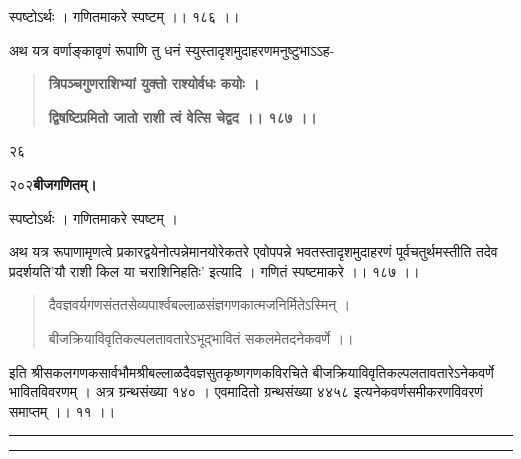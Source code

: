 \documentclass[11pt, openany]{book}
\begin{document}
\begin{sloppypar}
\hangindent=0.2in \hspace{0.2in}स्पष्टोऽर्थः । गणितमाकरे स्पष्टम् ।। १८६ ।। 

\hangindent=0.2in \hspace{0.2in}अथ यत्र वर्णाङ्कावृणं रूपाणि तु धनं स्युस्तादृशमुदाहरणमनुष्टुभाऽऽह- 

\begin{quote}
\hspace{0.5in}\textbf{त्रिपञ्चगुणराशिभ्यां युक्तो राश्योर्वधः कयोः ।}

\hspace{0.5in}\textbf{द्विषष्टिप्रमितो जातो राशी त्वं वेत्सि चेद्वद ।। १८७ ।।}
\end{quote}

 २६
\end{sloppypar}
\thispagestyle{empty}
\newpage

\onehalfspacing
२०२\hspace{2in}\textbf{बीजगणितम्।} 

\vspace{5mm}

\begin{sloppypar}
\hangindent=0.2in \hspace{0.2in}स्पष्टोऽर्थः । गणितमाकरे स्पष्टम् । 

\hangindent=0.2in \hspace{0.2in}अथ यत्र रूपाणामृणत्वे प्रकारद्वयेनोत्पन्नेमानयोरेकतरे एवोपपन्ने भवतस्तादृशमुदाहरणं पूर्वचतुर्थमस्तीति तदेव प्रदर्शयति\textendash 'यौ राशी किल या चराशिनिहतिः' इत्यादि । गणितं स्पष्टमाकरे ।। १८७ ।। 

\begin{center}\begin{quote}
दैवज्ञवर्यगणसंततसेव्यपार्श्वबल्लाळसंज्ञगणकात्मजनिर्मितेऽस्मिन् । 

बीजक्रियाविवृतिकल्पलतावतारेऽभूद्भावितं सकलमेतदनेकवर्णे ।। 
\end{quote}\end{center}

\hangindent=0.2in \hspace{0.2in}इति श्रीसकलगणकसार्वभौमश्रीबल्लाळदैवज्ञसुतकृष्णगणकविरचिते बीजक्रियाविवृतिकल्पलतावतारेऽनेकवर्णे भावितविवरणम् । अत्र ग्रन्थसंख्या १४० । एवमादितो ग्रन्थसंख्या ४४५८ इत्यनेकवर्णसमीकरणविवरणं समाप्तम् ।। ११ ।।
\begin{center}
    \rule{0.3\linewidth}{0.5pt}
    
    \vspace{-5mm}
    
    \rule{0.3\linewidth}{0.5pt}
\end{center}
\end{sloppypar}
\thispagestyle{empty}
\newpage
\end{document}
